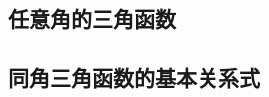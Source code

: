 \subsection{任意角的三角函数}
\begin{Practice}
  \begin{question}
    \item 
    \item 
    \item 
    \item 
    \item 
    \item 
  \end{question}
\end{Practice}
\subsection{同角三角函数的基本关系式}
\begin{Practice}
  \begin{question}
    \item 
    \item 
    \item 
    \item 
  \end{question}
\end{Practice}


\begin{Practice}
  \begin{question}
    \item 
    \item 
    \item 
    \item 
  \end{question}
\end{Practice}

\begin{Exercise}
  \begin{question}
    \item 
    \item 
    \item 
    \item 
    \item 
    \item 
    \item 
    \item 
    \item 
    \item 
    \item 
    \item 
    \item 
    \item 
    \item 
    \item 
    \item 
    \item 
    \item 
    \item 
    \item 
    \item 
  \end{question}
\end{Exercise}

